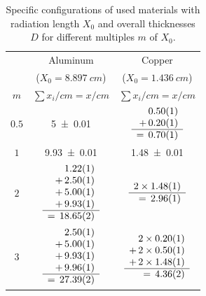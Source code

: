 \documentclass[sn-mathphys-num,iicol]{sn-jnl}
\theoremstyle{thmstyleone}
\theoremstyle{thmstyletwo}
\theoremstyle{thmstylethree}
\begin{document}
\begin{table}\centering
  \renewcommand*{\arraystretch}{1.15}
  \begin{tabular}{c|c|c}
    & Aluminum & Copper \\
    & {\fontsize{7}{5}\selectfont ($X_0=\SI{8.897}{cm}$)} & {\fontsize{7}{5}\selectfont ($X_0=\SI{1.436}{cm}$)} \\\hline
    $m$ & $\sum x_i/cm = x /cm$ & $\sum x_i/cm = x /cm$ \\\hline\hline\rule{0pt}{6ex}
    $0.5$ & \num{5\pm 0.01} & $\begin{array}{r}
                \num{0.5\pm 0.01} \\
                +\,\num{0.2\pm 0.01} \\\hline
                =\,\num{0.7\pm 0.01}    
              \end{array}$ \\\hline
    $1$ & \num{9.93\pm 0.01} & \num{1.48\pm 0.01} \\\hline
    $2$ & $\begin{array}{r}
      \num{1.22\pm 0.01} \\
      +\,\num{2.5\pm 0.01} \\
      +\,\num{5\pm 0.01} \\
      +\,\num{9.93\pm 0.01} \\\hline
      =\,\num{18.65\pm 0.02}
    \end{array}$ & $\begin{array}{r}
                      2\times\num{1.48\pm 0.01} \\\hline
                      =\,\num{2.96\pm 0.01}
                    \end{array}$ \\\hline
    $3$ & $\begin{array}{r}
      \num{2.5\pm 0.01} \\
      +\,\num{5\pm 0.01} \\
      +\,\num{9.93\pm 0.01} \\
      +\,\num{9.96\pm 0.01} \\\hline
      =\,\num{27.39\pm 0.02}
    \end{array}$ & $\begin{array}{r}
                      2\times\num{0.2\pm 0.01} \\
                      +\,2\times\num{0.5\pm 0.01} \\
                      +\,2\times\num{1.48\pm 0.01} \\\hline
                      =\,\num{4.36\pm 0.02}
                    \end{array}$ \\\hline
  \end{tabular}\vspace{3mm}
  \caption{Specific configurations of used materials with radiation length $X_0$ and overall thicknesses $D$ for different multiples $m$ of $X_0$.}
  \label{tab:config_materials}
\end{table}
\end{document}
